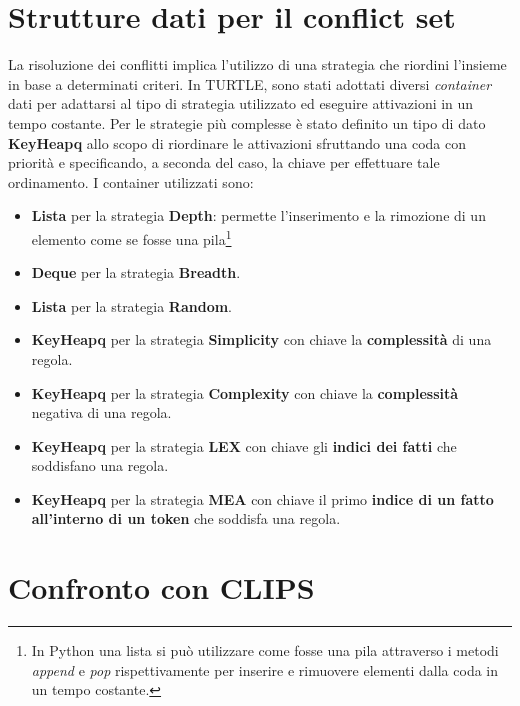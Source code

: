 \section{Strutture dati per il conflict set}

La risoluzione dei conflitti implica l'utilizzo di una strategia che riordini l'insieme in base a determinati criteri. In TURTLE, sono stati adottati diversi \emph{container} dati per adattarsi al tipo di strategia utilizzato ed eseguire attivazioni in un tempo costante.
Per le strategie più complesse è stato definito un tipo di dato \textbf{KeyHeapq} allo scopo di riordinare le attivazioni sfruttando una coda con priorità e specificando, a seconda del caso, la chiave per effettuare tale ordinamento.
I container utilizzati sono:
\begin{itemize}
\item \textbf{Lista} per la strategia \textbf{Depth}: permette l'inserimento e la rimozione di un elemento come se fosse una pila\footnote{In Python una lista si può utilizzare come fosse una pila attraverso i metodi \emph{append} e \emph{pop} rispettivamente per inserire e rimuovere elementi dalla coda in un tempo costante.}
\item \textbf{Deque} per la strategia \textbf{Breadth}.
\item \textbf{Lista} per la strategia \textbf{Random}.
\item \textbf{KeyHeapq} per la strategia \textbf{Simplicity} con chiave la \textbf{complessità} di una regola.
\item \textbf{KeyHeapq} per la strategia \textbf{Complexity} con chiave la \textbf{complessità} negativa di una regola.
\item \textbf{KeyHeapq} per la strategia \textbf{LEX} con chiave gli \textbf{indici dei fatti} che soddisfano una regola.
\item \textbf{KeyHeapq} per la strategia \textbf{MEA} con chiave il primo \textbf{indice di un fatto all'interno di un token} che soddisfa una regola.
\end{itemize}


\section{Confronto con CLIPS}

